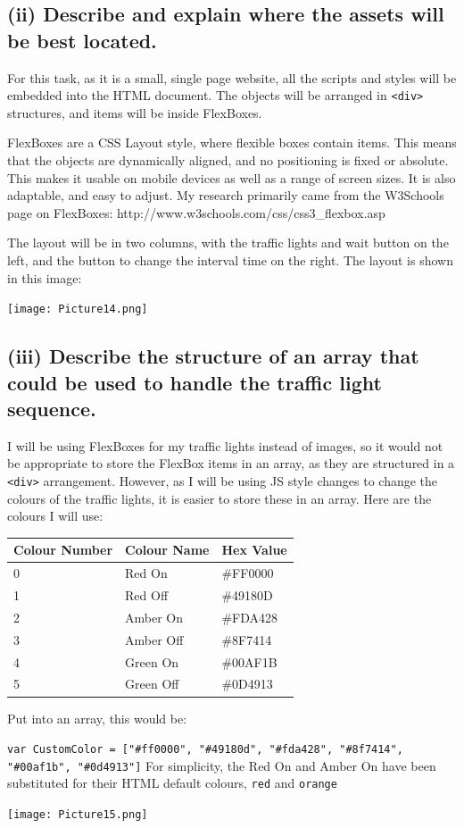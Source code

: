 \documentclass[a4paper]{article}
\begin{document}
\subsection{(ii) Describe and explain where the assets will be best located.}
For this task, as it is a small, single page website, all the scripts and styles will be embedded into the HTML document. The objects will be arranged in \verb|<div>| structures, and items will be inside FlexBoxes. \par
FlexBoxes are a CSS Layout style, where flexible boxes contain items. This means that the objects are dynamically aligned, and no positioning is fixed or absolute. This makes it usable on mobile devices as well as a range of screen sizes. It is also adaptable, and easy to adjust. My research primarily came from the W3Schools page on FlexBoxes: http://www.w3schools.com/css/css3\_flexbox.asp \par
The layout will be in two columns, with the traffic lights and wait button on the left, and the button to change the interval time on the right. The layout is shown in this image: \par
\noindent\texttt{[image: Picture14.png]}
\subsection{(iii) Describe the structure of an array that could be used to handle the traffic light sequence.}
I will be using FlexBoxes for my traffic lights instead of images, so it would not be appropriate to store the FlexBox items in an array, as they are structured in a \verb|<div>| arrangement. However, as I will be using JS style changes to change the colours of the traffic lights, it is easier to store these in an array. Here are the colours I will use:
\begin{center}
\begin{tabular}{ | m{7em} | m{7em} | m{7em} | }
  \hline
  Colour Number & Colour Name & Hex Value \\ [0.5ex] 
  \hline \hline	
  0 & Red On & \cellcolor[HTML]{FF0000} \#FF0000 \\
  \hline
  1 & Red Off & \cellcolor[HTML]{49180D} \color{white} \#49180D \\
  \hline
  2 & Amber On & \cellcolor[HTML]{FDA428} \#FDA428 \\
  \hline
  3 & Amber Off & \cellcolor[HTML]{8F7414} \color{white} \#8F7414 \\
  \hline
  4 & Green On & \cellcolor[HTML]{00AF1B} \#00AF1B \\
  \hline
  5 & Green Off & \cellcolor[HTML]{0d4913} \color{white} \#0D4913 \\
  \hline
\end{tabular}
\end{center}
Put into an array, this would be: \par
\verb|var CustomColor = ["#ff0000", "#49180d", "#fda428", "#8f7414", "#00af1b", "#0d4913"]|
For simplicity, the Red On and Amber On have been substituted for their HTML default colours, \verb|red| and \verb|orange| \par
\noindent\texttt{[image: Picture15.png]}
\end{document}
